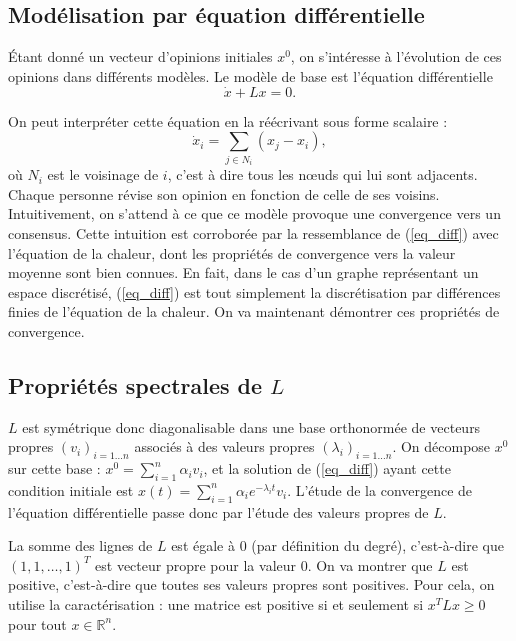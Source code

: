 \documentclass[12pt]{article}
\newcommand{\R}{\mathbb{R}}
\begin{document}
\subsection{Modélisation par équation différentielle}
Étant donné un vecteur d'opinions initiales $x^0$, on
s'intéresse à l'évolution de ces opinions dans différents
modèles. Le modèle de base est l'équation différentielle
\begin{equation}
 \label{eq_diff}
 \dot x + L x = 0.
\end{equation}

On peut interpréter cette équation en la réécrivant sous forme scalaire :
\begin{equation}
 \label{eq_diff_scal}
 \dot {x}_i = \sum_{j \in N_i} (x_j - x_i),
\end{equation}
où $N_i$ est le voisinage de $i$, c'est à dire tous les n\oe uds qui lui
sont adjacents. Chaque personne révise son opinion en fonction de
celle de ses voisins. Intuitivement, on s'attend à ce que ce modèle
provoque une convergence vers un consensus. Cette intuition est
corroborée par la ressemblance de (\ref{eq_diff}) avec l'équation de
la chaleur, dont les propriétés de convergence vers la valeur moyenne
sont bien connues. En fait, dans le cas d'un graphe représentant un
espace discrétisé, (\ref{eq_diff}) est tout simplement la
discrétisation par différences finies de l'équation de la chaleur. On
va maintenant démontrer ces propriétés de convergence.

\subsection{Propriétés spectrales de $L$}
\label{props_spectrales_L}
$L$ est symétrique donc diagonalisable dans une base orthonormée de
vecteurs propres $(v_i)_{i=1\dots n}$ associés à des valeurs propres
$(\lambda_i)_{i=1 \dots n}$. On décompose $x^0$ sur cette base : $x^0
= \sum_{i=1}^n \alpha_i v_i$, et la solution de (\ref{eq_diff}) ayant
cette condition initiale est $x(t) = \sum_{i=1}^n \alpha_i e^{-
 \lambda_i t} v_i$. L'étude de la convergence de l'équation
différentielle passe donc par l'étude des valeurs propres de $L$.

La somme des lignes de $L$ est égale à $0$ (par définition du degré),
c'est-à-dire que $(1, 1, \dots, 1)^T$ est vecteur propre pour la valeur
$0$. On va montrer que $L$ est positive, c'est-à-dire que toutes ses
valeurs propres sont positives. Pour cela, on utilise la
caractérisation : une matrice est positive si et seulement si $x^T L x \geq 0$ pour
tout $x \in \R^n$.
\end{document}
